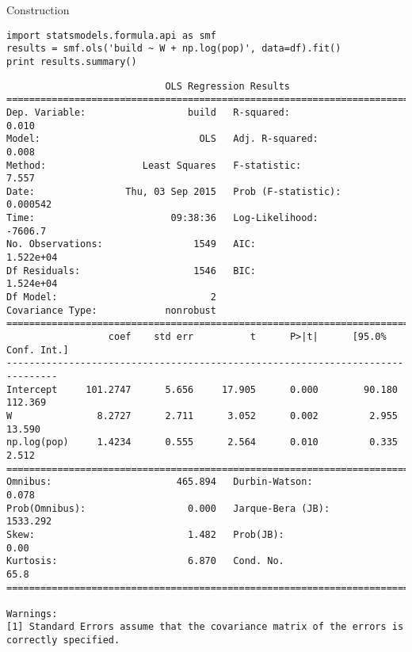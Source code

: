 \documentclass[12pt,fleqn]{article}\usepackage{common}
\begin{document}

Construction

\begin{verbatim}
import statsmodels.formula.api as smf
results = smf.ols('build ~ W + np.log(pop)', data=df).fit()
print results.summary()
\end{verbatim}

\begin{verbatim}
                            OLS Regression Results                            
==============================================================================
Dep. Variable:                  build   R-squared:                       0.010
Model:                            OLS   Adj. R-squared:                  0.008
Method:                 Least Squares   F-statistic:                     7.557
Date:                Thu, 03 Sep 2015   Prob (F-statistic):           0.000542
Time:                        09:38:36   Log-Likelihood:                -7606.7
No. Observations:                1549   AIC:                         1.522e+04
Df Residuals:                    1546   BIC:                         1.524e+04
Df Model:                           2                                         
Covariance Type:            nonrobust                                         
===============================================================================
                  coef    std err          t      P>|t|      [95.0% Conf. Int.]
-------------------------------------------------------------------------------
Intercept     101.2747      5.656     17.905      0.000        90.180   112.369
W               8.2727      2.711      3.052      0.002         2.955    13.590
np.log(pop)     1.4234      0.555      2.564      0.010         0.335     2.512
==============================================================================
Omnibus:                      465.894   Durbin-Watson:                   0.078
Prob(Omnibus):                  0.000   Jarque-Bera (JB):             1533.292
Skew:                           1.482   Prob(JB):                         0.00
Kurtosis:                       6.870   Cond. No.                         65.8
==============================================================================

Warnings:
[1] Standard Errors assume that the covariance matrix of the errors is correctly specified.
\end{verbatim}
\end{document}
